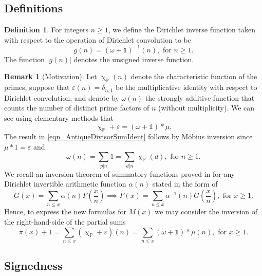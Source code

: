 \documentclass[11pt,reqno,a4letter]{article}
\numberwithin{equation}{section}
\numberwithin{figure}{section}
\numberwithin{table}{section}
\renewcommand{\chi}{\upchi}
\theoremstyle{plain}
\numberwithin{theorem}{section}
\theoremstyle{definition}
\newtheorem{remark}[theorem]{Remark}
\newtheorem{definition}[theorem]{Definition}
\begin{document}
\subsection{Definitions}

\begin{definition}
\label{def_gn_and_Absgn_v2} 
For integers $n \geq 1$, we define the Dirichlet inverse function 
taken with respect to the operation of Dirichlet convolution to be 
\[
g(n) = (\omega + \mathds{1})^{-1}(n), \text{ for } n \geq 1. 
\]
The function $|g(n)|$ denotes the unsigned inverse function. 
\end{definition}

\begin{remark}[Motivation] 
Let $\chi_{\mathbb{P}}(n)$ denote the characteristic function of the primes, suppose that 
$\varepsilon(n) = \delta_{n,1}$ be the multiplicative identity 
with respect to Dirichlet convolution, 
and denote by $\omega(n)$ the strongly additive function that counts the number of 
distinct prime factors of $n$ (without multiplicity). 
We can see using elementary methods that 
\begin{equation}
\label{eqn_AntiqueDivisorSumIdent} 
\chi_{\mathbb{P}} + \varepsilon = (\omega + \mathds{1}) \ast \mu. 
\end{equation} 
The result in \eqref{eqn_AntiqueDivisorSumIdent} follows by M\"obius inversion 
since $\mu \ast 1 = \varepsilon$ and 
\[
\omega(n) = \sum_{p|n} 1 = \sum_{d|n} \chi_{\mathbb{P}}(d), \text{ for } n \geq 1. 
\]
We recall an inversion theorem of summatory functions proved in 
\cite[\S 2.14]{APOSTOLANUMT} for any Dirichlet invertible arithmetic 
function $\alpha(n)$ stated in the form of 
\begin{equation}
\label{eqn_ApostolStmt_ClassicSummatoryFuncInvThm_v1} 
G(x) = \sum_{n \leq x} \alpha(n) F\left(\frac{x}{n}\right) \implies 
     F(x) = \sum_{n \leq x} \alpha^{-1}(n) G\left(\frac{x}{n}\right), 
     \text{ for } x \geq 1. 
\end{equation}
Hence, to express the new formulas for $M(x)$ 
we may consider the inversion of the right-hand-side of the partial sums 
\[
\pi(x) + 1 = \sum_{n \leq x} \left(\chi_{\mathbb{P}} + \varepsilon\right)(n) = 
	\sum_{n \leq x} (\omega + \mathds{1}) \ast \mu(n), 
	\text{ for } x \geq 1. 
\]
\end{remark}

\subsection{Signedness}
\label{Section_PrelimProofs_Config} 
\label{subSection_ProofOfSignednessOfgInvn_v1} 
\end{document}
